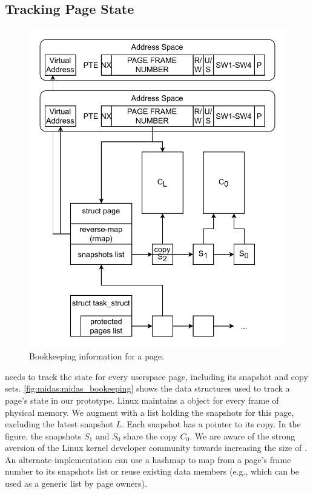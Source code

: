 \subsection{Tracking Page State}

\begin{figure}[]
  \centering
  \includegraphics[width=0.75\linewidth]{media/midas/book-keeping.pdf}
  \caption[\midas{}' bookkeeping information for a page.]
          {Bookkeeping information for a page.}
  \label{fig:midas:midas_bookeeping}
\end{figure}

\midas needs to track the state for every userspace page, including
its snapshot and copy sets.
\autoref{fig:midas:midas_bookeeping} shows the data structures used to
track a page's state in our prototype.
Linux maintains a  object for every frame of
physical memory.
We augment   with a list holding the snapshots
for this page, excluding the latest snapshot $L$.
Each snapshot has a pointer to its copy.
In the figure, the snapshots $S_1$ and $S_0$ share the copy $C_0$.
We are aware of the strong aversion of the
Linux kernel developer community towards increasing the size of
.
An alternate implementation can use a hashmap to
map from a page's frame number to its snapshots list or
reuse existing data members (e.g.,  which
can be used as a generic list by page owners).

